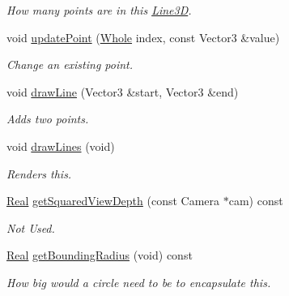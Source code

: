 \begin{DoxyCompactItemize}
\begin{DoxyCompactList}\small\item\em How many points are in this \hyperlink{classphys_1_1internal_1_1Line3D}{Line3D}. \item\end{DoxyCompactList}\item 
void \hyperlink{classphys_1_1internal_1_1Line3D_a4b2dec1619e4456ab0cb034ad34eb9d1}{updatePoint} (\hyperlink{namespacephys_a460f6bc24c8dd347b05e0366ae34f34a}{Whole} index, const Vector3 \&value)
\begin{DoxyCompactList}\small\item\em Change an existing point. \item\end{DoxyCompactList}\item 
void \hyperlink{classphys_1_1internal_1_1Line3D_a0320e600b9f363036c63eb47527bb854}{drawLine} (Vector3 \&start, Vector3 \&end)
\begin{DoxyCompactList}\small\item\em Adds two points. \item\end{DoxyCompactList}\item 
void \hyperlink{classphys_1_1internal_1_1Line3D_a008f0874c2213002e0c39330561f80f2}{drawLines} (void)
\begin{DoxyCompactList}\small\item\em Renders this. \item\end{DoxyCompactList}\item 
\hyperlink{namespacephys_af7eb897198d265b8e868f45240230d5f}{Real} \hyperlink{classphys_1_1internal_1_1Line3D_a04b77721c599bb368c791da7621fc814}{getSquaredViewDepth} (const Camera $\ast$cam) const 
\begin{DoxyCompactList}\small\item\em Not Used. \item\end{DoxyCompactList}\item 
\hyperlink{namespacephys_af7eb897198d265b8e868f45240230d5f}{Real} \hyperlink{classphys_1_1internal_1_1Line3D_a3fdd0ff2b7b22cebc71f796431afc7c8}{getBoundingRadius} (void) const 
\begin{DoxyCompactList}\small\item\em How big would a circle need to be to encapsulate this. \item\end{DoxyCompactList}\end{DoxyCompactItemize}
